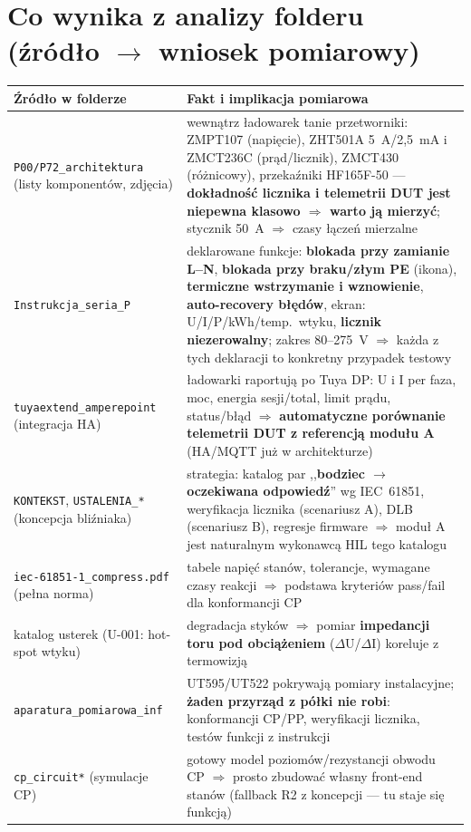 \documentclass[11pt,a4paper]{article}
\begin{document}
\section{Co wynika z analizy folderu (źródło $\to$ wniosek pomiarowy)}
\label{sec:analiza}
\begin{longtable}{@{}p{}p{}@{}}
\toprule
\textbf{Źródło w folderze} & \textbf{Fakt i implikacja pomiarowa}\\
\midrule
\texttt{P00/P72\_architektura} (listy komponentów, zdjęcia) & wewnątrz ładowarek tanie przetworniki:
ZMPT107 (napięcie), ZHT501A 5~A/2,5~mA i ZMCT236C (prąd/licznik), ZMCT430 (różnicowy), przekaźniki
HF165F-50 --- \textbf{dokładność licznika i telemetrii DUT jest niepewna klasowo $\Rightarrow$ warto ją
mierzyć}; stycznik 50~A $\Rightarrow$ czasy łączeń mierzalne\\
\texttt{Instrukcja\_seria\_P} & deklarowane funkcje: \textbf{blokada przy zamianie L--N}, \textbf{blokada
przy braku/złym PE} (ikona), \textbf{termiczne wstrzymanie i wznowienie}, \textbf{auto-recovery błędów},
ekran: U/I/P/kWh/temp.\ wtyku, \textbf{licznik niezerowalny}; zakres 80--275~V $\Rightarrow$ każda z tych
deklaracji to konkretny przypadek testowy\\
\texttt{tuyaextend\_amperepoint} (integracja HA) & ładowarki raportują po Tuya DP: U i I per faza,
moc, energia sesji/total, limit prądu, status/błąd $\Rightarrow$ \textbf{automatyczne porównanie
telemetrii DUT z referencją modułu A} (HA/MQTT już w architekturze)\\
\texttt{KONTEKST}, \texttt{USTALENIA\_*} (koncepcja bliźniaka) & strategia: katalog par
,,\textbf{bodziec $\to$ oczekiwana odpowiedź}'' wg IEC~61851, weryfikacja licznika (scenariusz A),
DLB (scenariusz B), regresje firmware $\Rightarrow$ moduł A jest naturalnym wykonawcą HIL tego katalogu\\
\texttt{iec-61851-1\_compress.pdf} (pełna norma) & tabele napięć stanów, tolerancje, wymagane czasy
reakcji $\Rightarrow$ podstawa kryteriów pass/fail dla konformancji CP\\
katalog usterek (U-001: hot-spot wtyku) & degradacja styków $\Rightarrow$ pomiar \textbf{impedancji
toru pod obciążeniem} ($\Delta$U/$\Delta$I) koreluje z termowizją\\
\texttt{aparatura\_pomiarowa\_inf} & UT595/UT522 pokrywają pomiary instalacyjne; \textbf{żaden
przyrząd z półki nie robi}: konformancji CP/PP, weryfikacji licznika, testów funkcji z instrukcji\\
\texttt{cp\_circuit*} (symulacje CP) & gotowy model poziomów/rezystancji obwodu CP $\Rightarrow$
prosto zbudować własny front-end stanów (fallback R2 z koncepcji --- tu staje się funkcją)\\
\bottomrule
\end{longtable}
\end{document}
